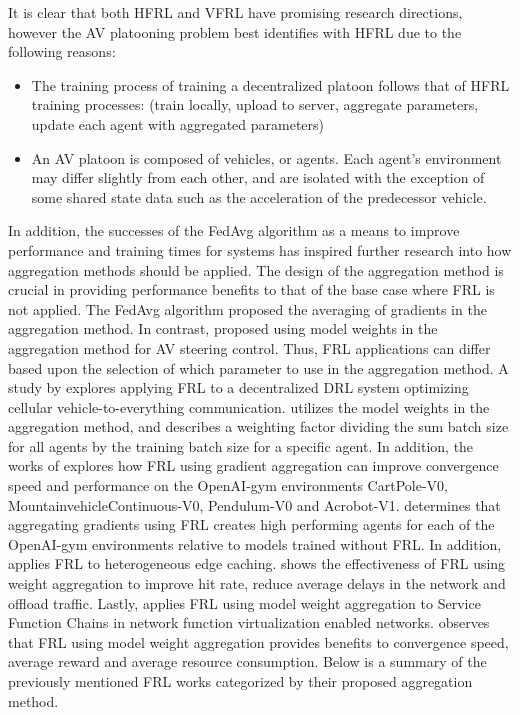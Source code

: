 It is clear that both HFRL and VFRL have promising research directions, however
the AV platooning problem best identifies with HFRL due to the following reasons:

\begin{itemize}
  \item The training process of training a decentralized platoon follows that of HFRL
  training processes: (train locally, upload to server, aggregate parameters, update
  each agent with aggregated parameters)
  \item An AV platoon is composed of vehicles, or agents. Each agent's environment may
  differ slightly from each other, and are isolated with the exception of some shared state
  data such as the acceleration of the predecessor vehicle.
\end{itemize}

In addition, the successes of the FedAvg algorithm as a means to improve performance and training
times for systems has inspired further research into how aggregation methods should
be applied.  The design of the aggregation method is crucial in providing performance
benefits to that of the base case where FRL is not applied.  The FedAvg
\cite{BrendanMcMahan2017a} algorithm proposed the averaging of gradients in the
aggregation method.  In contrast, \cite{Liang2019} proposed using model weights in
the aggregation method for AV steering control. Thus, FRL applications can differ
based upon the selection of which parameter to use in the aggregation method.  A study
by \cite{ZhangX2020} explores applying FRL to a decentralized DRL system optimizing
cellular vehicle-to-everything communication. \cite{ZhangX2020} utilizes the model
weights in the aggregation method, and describes a weighting factor dividing the sum
batch size for all agents by the training batch size for a specific agent.  In addition,
the works of \cite{LimHyun2021} explores how FRL using gradient aggregation can improve
convergence speed and performance on the OpenAI-gym environments CartPole-V0,
MountainvehicleContinuous-V0, Pendulum-V0 and Acrobot-V1.  \cite{LimHyun2021} determines
that aggregating gradients using FRL creates high performing agents for each of the
OpenAI-gym environments relative to models trained without FRL.  In addition,
\cite{WangXiaofei2021} applies FRL to heterogeneous edge caching.  \cite{WangXiaofei2021}
shows the effectiveness of FRL using weight aggregation to improve hit rate, reduce
average delays in the network and offload traffic. Lastly, \cite{Huang2021} applies FRL
using model weight aggregation to Service Function Chains in network function virtualization
enabled networks. \cite{Huang2021} observes that FRL using model weight aggregation
provides benefits to convergence speed, average reward and average resource consumption.
Below is a summary of the previously mentioned FRL works categorized by their proposed
aggregation method.

